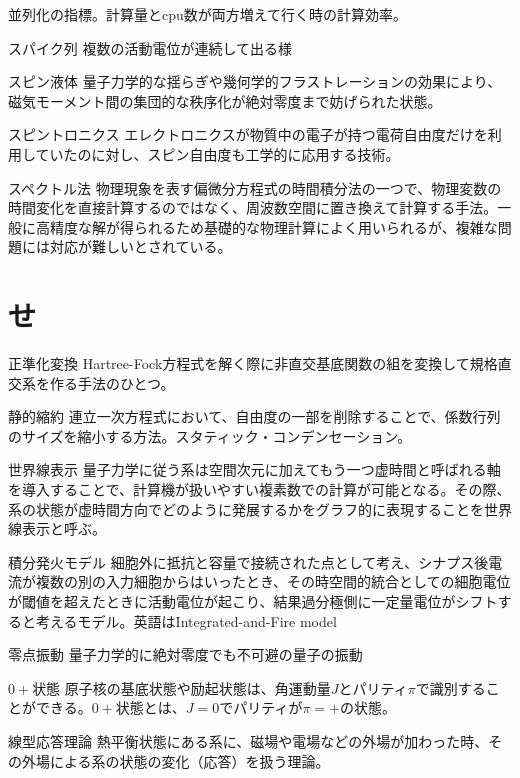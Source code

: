 \begin{用語集}
{並列化の指標。計算量とcpu数が両方増えて行く時の計算効率。}
\item{スパイク列}{}
{複数の活動電位が連続して出る様}
\item{スピン液体}{}
{量子力学的な揺らぎや幾何学的フラストレーションの効果により、磁気モーメント間の集団的な秩序化が絶対零度まで妨げられた状態。}
\item{スピントロニクス}{}
{エレクトロニクスが物質中の電子が持つ電荷自由度だけを利用していたのに対し、スピン自由度も工学的に応用する技術。}
\item{スペクトル法}{}
{物理現象を表す偏微分方程式の時間積分法の一つで、物理変数の時間変化を直接計算するのではなく、周波数空間に置き換えて計算する手法。一般に高精度な解が得られるため基礎的な物理計算によく用いられるが、複雑な問題には対応が難しいとされている。}
\section{せ}
\item{正準化変換}{}
{Hartree-Fock方程式を解く際に非直交基底関数の組を変換して規格直交系を作る手法のひとつ。}
\item{静的縮約}{}
{連立一次方程式において、自由度の一部を削除することで、係数行列のサイズを縮小する方法。スタティック・コンデンセーション。}
\item{世界線表示}{}
{量子力学に従う系は空間次元に加えてもう一つ虚時間と呼ばれる軸を導入することで、計算機が扱いやすい複素数での計算が可能となる。その際、系の状態が虚時間方向でどのように発展するかをグラフ的に表現することを世界線表示と呼ぶ。}
\item{積分発火モデル}{}
{細胞外に抵抗と容量で接続された点として考え、シナプス後電流が複数の別の入力細胞からはいったとき、その時空間的統合としての細胞電位が閾値を超えたときに活動電位が起こり、結果過分極側に一定量電位がシフトすると考えるモデル。英語はIntegrated-and-Fire model}
\item{零点振動}{}
{量子力学的に絶対零度でも不可避の量子の振動}
\item{$0+$状態}{}
{原子核の基底状態や励起状態は、角運動量$J$とパリティ$\pi$で識別することができる。$0+$状態とは、$J=0$でパリティが$\pi=+$の状態。}
\item{線型応答理論}{}
{熱平衡状態にある系に、磁場や電場などの外場が加わった時、その外場による系の状態の変化（応答）を扱う理論。}

\end{用語集}
